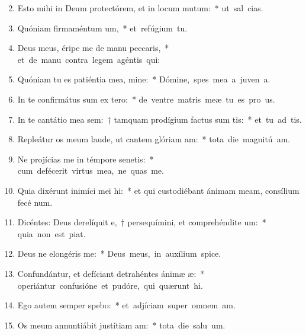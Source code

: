 \begin{flushleft}
\begin{enumerate}[leftmargin=*]
\setcounter{enumi}{1}


\item Esto mihi in Deum protectórem, et in locum mutum:~* \mbox{ut sal  cias.}
\item Quóniam firmaméntum um,~* \mbox{et refúgium   tu.}
\item Deus meus, éripe me de manu peccaris,~* \mbox{et de manu contra legem agéntis  qui:}
\item Quóniam tu es patiéntia mea, mine:~* \mbox{Dómine, spes mea a juven a.}
\item In te confirmátus sum ex tero:~* \mbox{de ventre matris meæ tu es pro us.}
\item In te cantátio mea sem:~† tamquam prodígium factus sum tis:~* \mbox{et tu ad tis.}
\item Repleátur os meum laude, ut cantem glóriam am:~* \mbox{tota die magnitú am.}
\item Ne projícias me in témpore senetis:~* \mbox{cum defécerit virtus mea, ne quas me.}
\item Quia dixérunt inimíci mei hi:~* et qui custodiébant ánimam meam, consílium fecé  num.
\item Dicéntes: Deus derelíquit e,~† persequímini, et comprehéndite um:~* \mbox{quia non est  piat.}
\item Deus ne elongéris  me:~* \mbox{Deus meus, in auxílium  spice.}
\item Confundántur, et defíciant detrahéntes ánimæ æ:~* \mbox{operiántur confusióne et pudóre, qui quærunt  hi.}
\item Ego autem semper spebo:~* \mbox{et adjíciam super omnem  am.}
\item Os meum annuntiábit justítiam am:~* \mbox{tota die salu um.}

\end{enumerate}
\end{flushleft}
